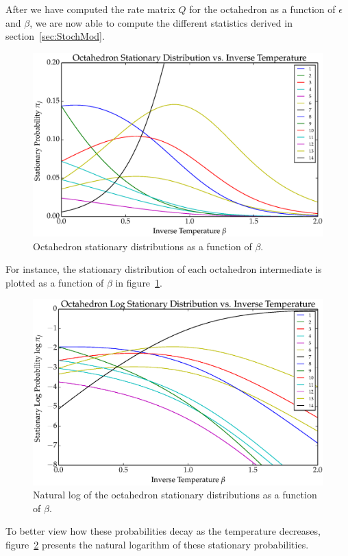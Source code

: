 After we have computed the rate matrix $Q$ for the octahedron as a function of $\epsilon$ and $\beta$, we are now able to compute the different statistics derived in section~\ref{sec:StochMod}. 
\begin{figure}[ht]
\centering
  \includegraphics[scale=0.6]{images/octahedron_pi.eps}
\caption{Octahedron stationary distributions as a function of $\beta$.}
\label{fig:OctaPi}
\end{figure}
For instance, the stationary distribution of each octahedron intermediate is plotted as a function of $\beta$ in figure~\ref{fig:OctaPi}.
\begin{figure}[ht]
\centering
  \includegraphics[scale=0.6]{images/octahedron_log_pi.eps}
\caption{Natural log of the octahedron stationary distributions as a function of $\beta$.}
\label{fig:OctaLogPi}
\end{figure}
To better view how these probabilities decay as the temperature decreases, figure~\ref{fig:OctaLogPi} presents the natural logarithm of these stationary probabilities.

